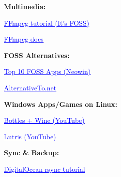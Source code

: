 \documentclass[
  english,
  paper=a4,
  oneside  ,captions=tableheading
]{scrartcl}
\begin{document}
\textbf{Multimedia:}

%
  \par\vspace{0.5ex}%
  \href{https://itsfoss.com/ffmpeg/}{\textcolor{blue}{\underline{\faLink\quad FFmpeg tutorial (It's FOSS)}}}%
  \par\vspace{0.5ex}%

%
  \par\vspace{0.5ex}%
  \href{https://ffmpeg.org/ffmpeg.html}{\textcolor{blue}{\underline{\faLink\quad FFmpeg docs}}}%
  \par\vspace{0.5ex}%

\textbf{FOSS Alternatives:}

%
  \par\vspace{0.5ex}%
  \href{https://www.neowin.net/guides/top-10-foss-apps-to-make-your-linux-experience-more-enjoyable/}{\textcolor{blue}{\underline{\faLink\quad Top 10 FOSS Apps (Neowin)}}}%
  \par\vspace{0.5ex}%

%
  \par\vspace{0.5ex}%
  \href{https://alternativeto.net/}{\textcolor{blue}{\underline{\faLink\quad AlternativeTo.net}}}%
  \par\vspace{0.5ex}%

\textbf{Windows Apps/Games on Linux:}

%
  \par\vspace{0.5ex}%
  \href{https://youtu.be/xGbQZt96q54?si=FgQJ\_\_YMpISs7L1c}{\textcolor{blue}{\underline{\faLink\quad Bottles + Wine (YouTube)}}}%
  \par\vspace{0.5ex}%

%
  \par\vspace{0.5ex}%
  \href{https://youtu.be/JXHvGgiJJG0?si=1fI81xIr7zichNDy}{\textcolor{blue}{\underline{\faLink\quad Lutris (YouTube)}}}%
  \par\vspace{0.5ex}%

\textbf{Sync \& Backup:}

%
  \par\vspace{0.5ex}%
  \href{https://www.digitalocean.com/community/tutorials/how-to-use-rsync-to-sync-local-and-remote-directories}{\textcolor{blue}{\underline{\faLink\quad DigitalOcean rsync tutorial}}}%
  \par\vspace{0.5ex}%
\end{document}
